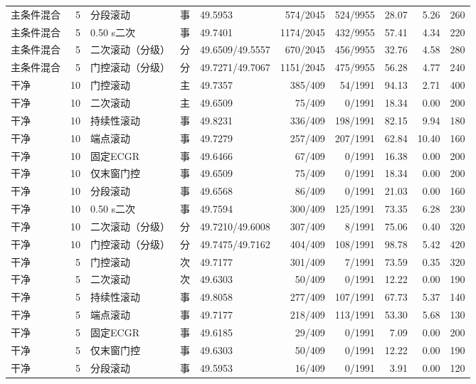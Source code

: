 \documentclass[UTF8,a4paper,11pt]{ctexart}
\begin{document}
\begin{longtable}{lrlclrrrrr}
主条件混合 & 5 & 分段滚动 & 事 & 49.5953 & 574/2045 & 524/9955 & 28.07 & 5.26 & 260 \\
主条件混合 & 5 & 0.50 s二次 & 事 & 49.7401 & 1174/2045 & 432/9955 & 57.41 & 4.34 & 220 \\
主条件混合 & 5 & 二次滚动（分级） & 分 & 49.6509/49.5557 & 670/2045 & 456/9955 & 32.76 & 4.58 & 280 \\
主条件混合 & 5 & 门控滚动（分级） & 分 & 49.7271/49.7067 & 1151/2045 & 475/9955 & 56.28 & 4.77 & 240 \\
干净 & 10 & 门控滚动 & 主 & 49.7357 & 385/409 & 54/1991 & 94.13 & 2.71 & 400 \\
干净 & 10 & 二次滚动 & 主 & 49.6509 & 75/409 & 0/1991 & 18.34 & 0.00 & 200 \\
干净 & 10 & 持续性滚动 & 事 & 49.8231 & 336/409 & 198/1991 & 82.15 & 9.94 & 180 \\
干净 & 10 & 端点滚动 & 事 & 49.7279 & 257/409 & 207/1991 & 62.84 & 10.40 & 160 \\
干净 & 10 & 固定ECGR & 事 & 49.6466 & 67/409 & 0/1991 & 16.38 & 0.00 & 200 \\
干净 & 10 & 仅末窗门控 & 事 & 49.6509 & 75/409 & 0/1991 & 18.34 & 0.00 & 200 \\
干净 & 10 & 分段滚动 & 事 & 49.6568 & 86/409 & 0/1991 & 21.03 & 0.00 & 160 \\
干净 & 10 & 0.50 s二次 & 事 & 49.7594 & 300/409 & 125/1991 & 73.35 & 6.28 & 230 \\
干净 & 10 & 二次滚动（分级） & 分 & 49.7210/49.6008 & 307/409 & 8/1991 & 75.06 & 0.40 & 320 \\
干净 & 10 & 门控滚动（分级） & 分 & 49.7475/49.7162 & 404/409 & 108/1991 & 98.78 & 5.42 & 420 \\
干净 & 5 & 门控滚动 & 次 & 49.7177 & 301/409 & 7/1991 & 73.59 & 0.35 & 320 \\
干净 & 5 & 二次滚动 & 次 & 49.6303 & 50/409 & 0/1991 & 12.22 & 0.00 & 190 \\
干净 & 5 & 持续性滚动 & 事 & 49.8058 & 277/409 & 107/1991 & 67.73 & 5.37 & 140 \\
干净 & 5 & 端点滚动 & 事 & 49.7177 & 218/409 & 113/1991 & 53.30 & 5.68 & 130 \\
干净 & 5 & 固定ECGR & 事 & 49.6185 & 29/409 & 0/1991 & 7.09 & 0.00 & 200 \\
干净 & 5 & 仅末窗门控 & 事 & 49.6303 & 50/409 & 0/1991 & 12.22 & 0.00 & 190 \\
干净 & 5 & 分段滚动 & 事 & 49.5953 & 16/409 & 0/1991 & 3.91 & 0.00 & 120 \\

\end{longtable}
\end{document}
